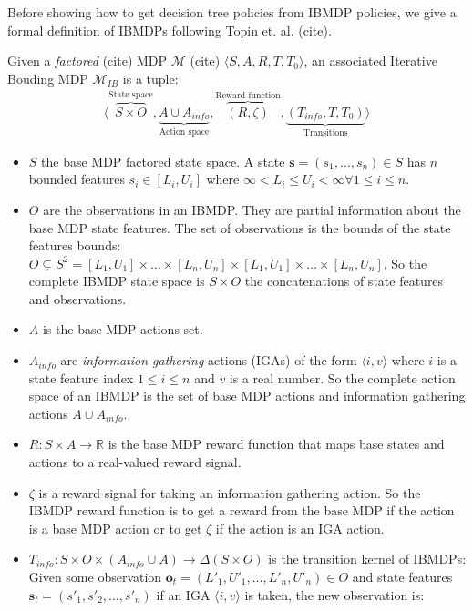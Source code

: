 Before showing how to get decision tree policies from IBMDP policies, we give a formal definition of IBMDPs following Topin et. al. (cite).

\begin{definition}
Given a \textit{factored} (cite) MDP $\mathcal{M}$ (cite) $\langle S, A, R, T, T_0 \rangle$, an associated Iterative Bouding MDP $\mathcal{M}_{IB}$ is a tuple:
\begin{align*}
    \langle \overbrace{S \times O}^{\text{State space}}, \underbrace{A \cup A_{info}}_{\text{Action space}}, \overbrace{(R, \zeta)}^{\text{Reward function}}, \underbrace{(T_{info}, T, T_0)}_{\text{Transitions}}\rangle
\end{align*}

\begin{itemize}
\item $S$ the base MDP factored state space. A state $\boldsymbol{s} = (s_1, \dots, s_n)\in S$ has $n$ bounded features $s_i \in [L_i, U_i]$ where $\infty < L_i \leq U_i < \infty \forall 1\leq i \leq n$.
\item $O$ are the observations in an IBMDP. They are partial information about the base MDP state features. The set of observations is the bounds of the state features bounds: $O\subsetneq S^2 =  [L_1, U_1]\times \dots \times [L_n, U_n] \times [L_1, U_1]\times \dots \times [L_n, U_n]$. So the complete IBMDP state space is $S \times O$ the concatenations of state features and observations.
\item $A$ is the base MDP actions set.
\item $A_{info}$ are \textit{information gathering} actions (IGAs) of the form $\langle i, v \rangle$ where $i$ is a state feature index $1 \leq i \leq n$ and $v$ is a real number. So the complete action space of an IBMDP is the set of base MDP actions and information gathering actions $A \cup A_{info}$.
\item $R: S\times A \rightarrow \mathbb{R}$ is the base MDP reward function that maps base states and actions to a real-valued reward signal.
\item $\zeta$ is a reward signal for taking an information gathering action. So the IBMDP reward function is to get a reward from the base MDP if the action is a base MDP action or to get $\zeta$ if the action is an IGA action.
\item $T_{info}: S\times O \times( A_{info} \cup A )\rightarrow \Delta (S\times O)$ is the transition kernel of IBMDPs: 
Given some observation $\boldsymbol{o}_t = (L'_1, U'_1, \dots, L'_n, U'_n) \in O$ and state features $\boldsymbol{s}_t=(s'_1, s'_2, \dots, s'_n)$ if an IGA $\langle i, v \rangle$ is taken, the new observation is:

\end{itemize}
\end{definition}
